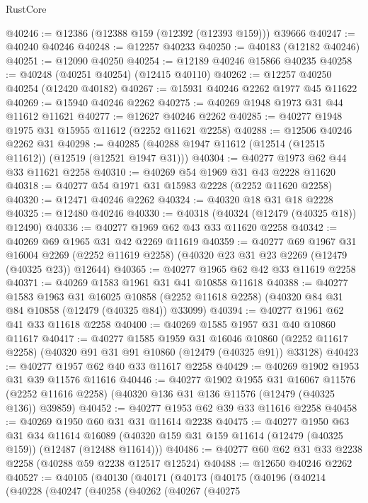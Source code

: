 \begin{lexlean}{RustCore}
\begin{coremodule}
@40246 := @12386 (@12388 @159 (@12392 (@12393 @159))) @39666
@40247 := @40240 @40246
@40248 := @12257 @40233
@40250 := @40183 (@12182 @40246)
@40251 := @12090 @40250
@40254 := @12189 @40246 @15866 @40235
@40258 := @40248 (@40251 @40254) (@12415 @40110)
@40262 := @12257 @40250 @40254 (@12420 @40182)
@40267 := @15931 @40246 @2262 @1977 @45 @11622
@40269 := @15940 @40246 @2262
@40275 := @40269 @1948 @1973 @31 @44 @11612 @11621
@40277 := @12627 @40246 @2262
@40285 := @40277 @1948 @1975 @31 @15955 @11612 (@2252 @11621 @2258)
@40288 := @12506 @40246 @2262 @31
@40298 := @40285 (@40288 @1947 @11612 (@12514 (@12515 @11612)) (@12519 (@12521 @1947 @31)))
@40304 := @40277 @1973 @62 @44 @33 @11621 @2258
@40310 := @40269 @54 @1969 @31 @43 @2228 @11620
@40318 := @40277 @54 @1971 @31 @15983 @2228 (@2252 @11620 @2258)
@40320 := @12471 @40246 @2262
@40324 := @40320 @18 @31 @18 @2228
@40325 := @12480 @40246
@40330 := @40318 (@40324 (@12479 (@40325 @18)) @12490)
@40336 := @40277 @1969 @62 @43 @33 @11620 @2258
@40342 := @40269 @69 @1965 @31 @42 @2269 @11619
@40359 := @40277
    @69
    @1967
    @31
    @16004
    @2269
    (@2252 @11619 @2258)
    (@40320 @23 @31 @23 @2269 (@12479 (@40325 @23)) @12644)
@40365 := @40277 @1965 @62 @42 @33 @11619 @2258
@40371 := @40269 @1583 @1961 @31 @41 @10858 @11618
@40388 := @40277
    @1583
    @1963
    @31
    @16025
    @10858
    (@2252 @11618 @2258)
    (@40320 @84 @31 @84 @10858 (@12479 (@40325 @84)) @33099)
@40394 := @40277 @1961 @62 @41 @33 @11618 @2258
@40400 := @40269 @1585 @1957 @31 @40 @10860 @11617
@40417 := @40277
    @1585
    @1959
    @31
    @16046
    @10860
    (@2252 @11617 @2258)
    (@40320 @91 @31 @91 @10860 (@12479 (@40325 @91)) @33128)
@40423 := @40277 @1957 @62 @40 @33 @11617 @2258
@40429 := @40269 @1902 @1953 @31 @39 @11576 @11616
@40446 := @40277
    @1902
    @1955
    @31
    @16067
    @11576
    (@2252 @11616 @2258)
    (@40320 @136 @31 @136 @11576 (@12479 (@40325 @136)) @39859)
@40452 := @40277 @1953 @62 @39 @33 @11616 @2258
@40458 := @40269 @1950 @60 @31 @31 @11614 @2238
@40475 := @40277
    @1950
    @63
    @31
    @34
    @11614
    @16089
    (@40320 @159 @31 @159 @11614 (@12479 (@40325 @159)) (@12487 (@12488 @11614)))
@40486 := @40277 @60 @62 @31 @33 @2238 @2258 (@40288 @59 @2238 @12517 @12524)
@40488 := @12650 @40246 @2262
@40527 := @40105
    (@40130
      (@40171
        (@40173
          (@40175
            (@40196
              (@40214
                (@40228
                  (@40247
                    (@40258
                      (@40262
                        (@40267
                          (@40275

\end{coremodule}
\end{lexlean}
